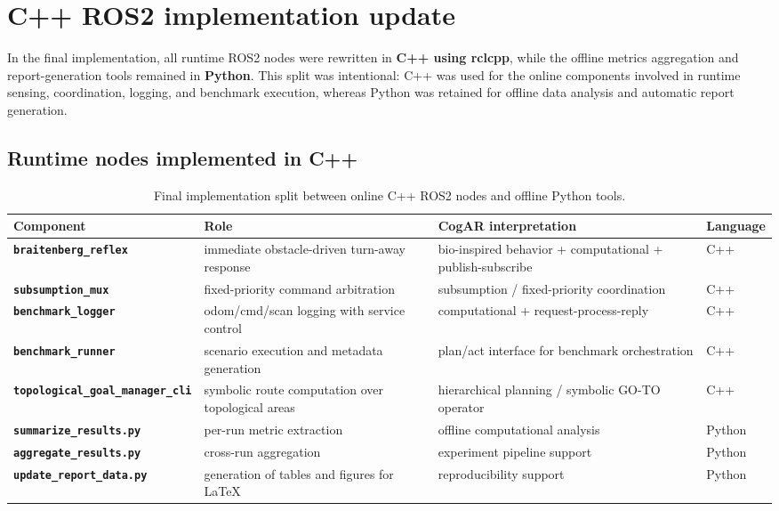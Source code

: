 \section{C++ ROS2 implementation update}

In the final implementation, all runtime ROS2 nodes were rewritten in \textbf{C++ using rclcpp}, while the
offline metrics aggregation and report-generation tools remained in \textbf{Python}. This split was intentional:
C++ was used for the online components involved in runtime sensing, coordination, logging, and benchmark
execution, whereas Python was retained for offline data analysis and automatic report generation.

\subsection{Runtime nodes implemented in C++}

\begin{table}[H]
\centering
\caption{Final implementation split between online C++ ROS2 nodes and offline Python tools.}
\small
\begin{tabularx}{\linewidth}{>{\bfseries}p{3.2cm}p{3.1cm}X>{\raggedright\arraybackslash}p{1.6cm}}
\toprule
Component & Role & CogAR interpretation & Language \\
\midrule
\texttt{braitenberg\_reflex} & immediate obstacle-driven turn-away response & bio-inspired behavior + computational + publish-subscribe & C++ \\
\texttt{subsumption\_mux} & fixed-priority command arbitration & subsumption / fixed-priority coordination & C++ \\
\texttt{benchmark\_logger} & odom/cmd/scan logging with service control & computational + request-process-reply & C++ \\
\texttt{benchmark\_runner} & scenario execution and metadata generation & plan/act interface for benchmark orchestration & C++ \\
\texttt{topological\_goal\_manager\_cli} & symbolic route computation over topological areas & hierarchical planning / symbolic GO-TO operator & C++ \\
\texttt{summarize\_results.py} & per-run metric extraction & offline computational analysis & Python \\
\texttt{aggregate\_results.py} & cross-run aggregation & experiment pipeline support & Python \\
\texttt{update\_report\_data.py} & generation of tables and figures for LaTeX & reproducibility support & Python \\
\bottomrule
\end{tabularx}
\end{table}

